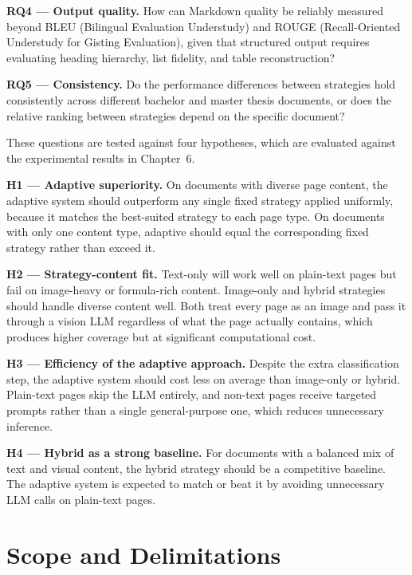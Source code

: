 \textbf{RQ4 --- Output quality.} How can Markdown quality be reliably measured
beyond BLEU (Bilingual Evaluation Understudy) and ROUGE (Recall-Oriented
Understudy for Gisting Evaluation), given that structured output requires
evaluating heading
hierarchy, list fidelity, and table reconstruction?

\textbf{RQ5 --- Consistency.} Do the performance differences between strategies
hold consistently across different bachelor and master thesis documents, or does
the relative ranking between strategies depend on the specific document?

These questions are tested against four hypotheses, which are evaluated against
the experimental results in Chapter~6.

\textbf{H1 --- Adaptive superiority.} On documents with diverse page content,
the adaptive system should outperform any single fixed strategy applied
uniformly, because it matches the best-suited strategy to each page type.
On documents with only one content type, adaptive should equal the
corresponding fixed strategy rather than exceed it.

\textbf{H2 --- Strategy-content fit.} Text-only will work well on plain-text
pages but fail on image-heavy or formula-rich content. Image-only and hybrid
strategies should handle diverse content well. Both treat every page as an
image and pass it through a vision LLM regardless of what the page actually
contains, which produces higher coverage but at significant computational cost.

\textbf{H3 --- Efficiency of the adaptive approach.} Despite the extra
classification step, the adaptive system should cost less on average than
image-only or hybrid. Plain-text pages skip the LLM entirely, and non-text
pages receive targeted prompts rather than a single general-purpose one,
which reduces unnecessary inference.

\textbf{H4 --- Hybrid as a strong baseline.} For documents with a balanced
mix of text and visual content, the hybrid strategy should be a competitive
baseline. The adaptive system is expected to match or beat it by avoiding
unnecessary LLM calls on plain-text pages.

\section{Scope and Delimitations}

